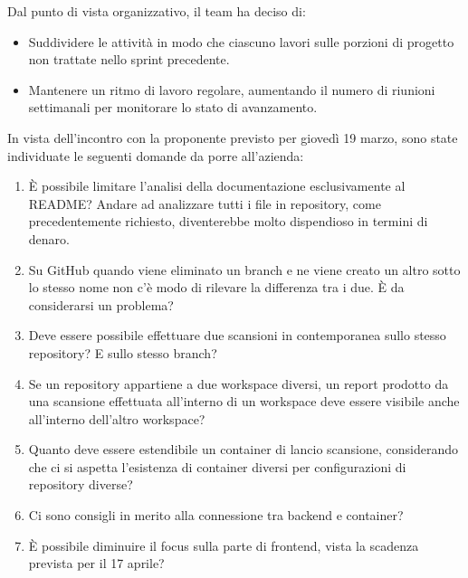 \documentclass[a4paper, 11pt]{article}
\begin{document}
Dal punto di vista organizzativo, il team ha deciso di:
\begin{itemize}
    \item Suddividere le attività in modo che ciascuno lavori sulle porzioni di progetto non trattate nello sprint precedente.
    \item Mantenere un ritmo di lavoro regolare, aumentando il numero di riunioni settimanali per monitorare lo stato di avanzamento.
\end{itemize}

In vista dell'incontro con la proponente previsto per giovedì 19 marzo, sono state individuate le seguenti domande da porre all'azienda:
\begin{enumerate}
	\item È possibile limitare l'analisi della documentazione esclusivamente al README? Andare ad analizzare tutti i file in repository, come precedentemente richiesto, diventerebbe molto dispendioso in termini di denaro.
	\item Su GitHub quando viene eliminato un branch e ne viene creato un altro sotto lo stesso nome non c'è modo di rilevare la differenza tra i due. È da considerarsi un problema?
	\item Deve essere possibile effettuare due scansioni in contemporanea sullo stesso repository? E sullo stesso branch?
	\item Se un repository appartiene a due workspace diversi, un report prodotto da una scansione effettuata all'interno di un workspace deve essere visibile anche all'interno dell'altro workspace?
	\item Quanto deve essere estendibile un container di lancio scansione, considerando che ci si aspetta l'esistenza di container diversi per configurazioni di repository diverse?
	\item Ci sono consigli in merito alla connessione tra backend e container?
	\item È possibile diminuire il focus sulla parte di frontend, vista la scadenza prevista per il 17 aprile?
\end{enumerate}


\end{document}
